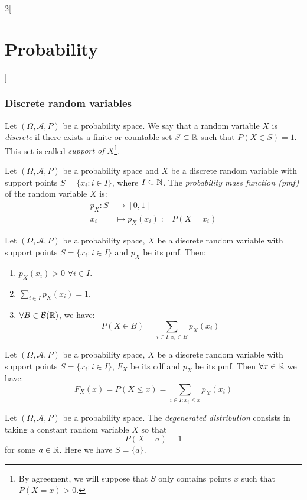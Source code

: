 \documentclass[../../../main.tex]{subfiles}
\begin{document}
\begin{multicols}{2}[\section{Probability}]
  \subsubsection*{Discrete random  variables}
  \begin{definition}
    Let $(\Omega,\mathcal{A},P)$ be a probability space. We say that a random variable $X$ is \textit{discrete} if there exists a finite or countable set $S\subset\mathbb{R}$ such that $P(X\in S)=1$. This set is called \textit{support of $X$}\footnote{By agreement, we will suppose that $S$ only contains points $x$ such that $P(X=x)>0$.}.
  \end{definition}
  \begin{definition}
    Let $(\Omega,\mathcal{A},P)$ be a probability space and $X$ be a discrete random variable with support points $S=\{x_i:i\in I\}$, where $I\subseteq\mathbb{N}$. The \textit{probability mass function (pmf)} of the random variable $X$ is:
    \begin{align*}
      p_X:S & \longrightarrow [0,1]          \\
      x_i   & \longmapsto p_X(x_i):=P(X=x_i)
    \end{align*}
  \end{definition}
  \begin{prop}
    Let $(\Omega,\mathcal{A},P)$ be a probability space, $X$ be a discrete random variable with support points $S=\{x_i:i\in I\}$ and $p_X$ be its pmf. Then:
    \begin{enumerate}
      \item $p_X(x_i)>0$ $\forall i\in I$.
      \item $\displaystyle\sum_{i\in I}p_X(x_i)=1$.
      \item $\forall B\in\mathcal{B}(\mathbb{R})$, we have: $$P(X\in B)=\sum_{i\in I:x_i\in B}p_X(x_i)$$
    \end{enumerate}
  \end{prop}
  \begin{corollary}
    Let $(\Omega,\mathcal{A},P)$ be a probability space, $X$ be a discrete random variable with support points $S=\{x_i:i\in I\}$, $F_X$ be its cdf and $p_X$ be its pmf. Then $\forall x\in\mathbb{R}$ we have: $$F_X(x)=P(X\leq x)=\sum_{i\in I:x_i\leq x}p_X(x_i)$$
  \end{corollary}
  \begin{definition}
    Let $(\Omega,\mathcal{A},P)$ be a probability space. The \textit{degenerated distribution} consists in taking a constant random variable $X$ so that $$P(X=a)=1$$ for some $a\in\mathbb{R}$. Here we have $S=\{a\}$.

\end{definition}
\end{multicols}
\end{document}

